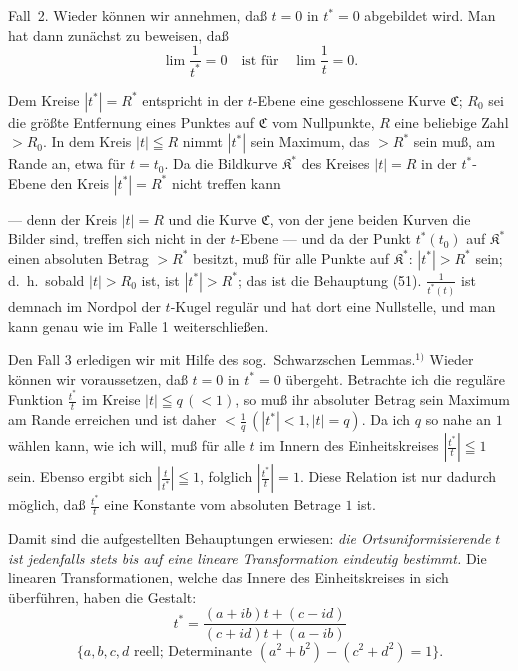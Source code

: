 \documentclass{article}
\begin{document}
Fall~2. Wieder können wir annehmen, daß $t = 0$ in $t^* = 0$ abgebildet wird. Man hat dann zunächst zu beweisen, daß
\[ \lim \frac{1}{t^*} = 0 \quad \text{ist für} \quad \lim \frac{1}{t} = 0. \tag{51} \]


Dem Kreise $|t^*| = R^*$ entspricht in der $t$-Ebene eine geschlossene Kurve $\mathfrak{C}$; $R_0$ sei die größte Entfernung eines Punktes auf $\mathfrak{C}$ vom Nullpunkte, $R$ eine beliebige Zahl $> R_0$. In dem Kreis $|t| \leqq R$ nimmt $|t^*|$ sein Maximum, das $> R^*$ sein muß, am Rande an, etwa für $t = t_0$. Da die Bildkurve $\mathfrak{K}^*$ des Kreises $|t| = R$ in der $t^*$-Ebene den Kreis $|t^*| = R^*$ nicht treffen kann

--- denn der Kreis $|t| = R$ und die Kurve $\mathfrak{C}$, von der jene beiden Kurven die Bilder sind, treffen sich nicht in der $t$-Ebene --- und da der Punkt $t^*(t_0)$ auf $\mathfrak{K}^*$ einen absoluten Betrag $> R^*$ besitzt, muß für alle Punkte auf $\mathfrak{K}^*$: $|t^*| > R^*$ sein; d.~h.\ sobald $|t| > R_0$ ist, ist $|t^*| > R^*$; das ist die Behauptung (51). $\frac{1}{t^*(t)}$ ist demnach im Nordpol der $t$-Kugel regulär und hat dort eine Nullstelle, und man kann genau wie im Falle 1 weiterschließen.

Den Fall 3 erledigen wir mit Hilfe des sog.\ Schwarzschen Lemmas.${}^{1)}$ Wieder können wir voraussetzen, daß $t = 0$ in $t^* = 0$ übergeht. Betrachte ich die reguläre Funktion $\frac{t^*}{t}$ im Kreise $|t| \leqq q\,(< 1)$, so muß ihr absoluter Betrag sein Maximum am Rande erreichen und ist daher $< \frac{1}{q}\,(|t^*| < 1, |t| = q)$. Da ich $q$ so nahe an $1$ wählen kann, wie ich will, muß für alle $t$ im Innern des Einheitskreises $\left| \frac{t^*}{t} \right| \leqq 1$ sein. Ebenso ergibt sich $\left| \frac{t}{t^*} \right| \leqq 1$, folglich $\left| \frac{t^*}{t} \right| = 1$. Diese Relation ist nur dadurch möglich, daß $\frac{t^*}{t}$ eine Konstante vom absoluten Betrage $1$ ist.

Damit sind die aufgestellten Behauptungen erwiesen: \emph{die Ortsuniformisierende $t$ ist jedenfalls stets bis auf eine lineare Transformation eindeutig bestimmt.} Die linearen Transformationen, welche das Innere des Einheitskreises in sich überführen, haben die Gestalt:
\[ t^* = \frac{(a + ib)t + (c - id)}{(c + id)t + (a - ib)} \tag{52} \]
\[ \{ a, b, c, d \text{ reell; Determinante } (a^2 + b^2) - (c^2 + d^2) = 1 \}. \]
\end{document}
